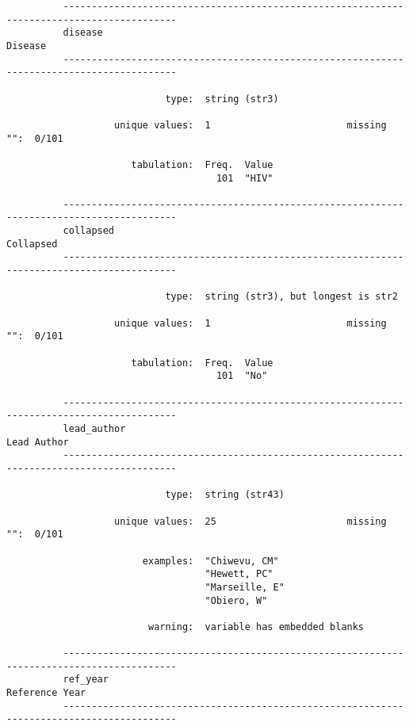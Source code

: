 \documentclass{article}
\begin{document}
\begin{verbatim}
          
          
          
          ------------------------------------------------------------------------------------------
          disease                                                                            Disease
          ------------------------------------------------------------------------------------------
          
                            type:  string (str3)
          
                   unique values:  1                        missing "":  0/101
          
                      tabulation:  Freq.  Value
                                     101  "HIV"
          
          ------------------------------------------------------------------------------------------
          collapsed                                                                        Collapsed
          ------------------------------------------------------------------------------------------
          
                            type:  string (str3), but longest is str2
          
                   unique values:  1                        missing "":  0/101
          
                      tabulation:  Freq.  Value
                                     101  "No"
          
          ------------------------------------------------------------------------------------------
          lead_author                                                                    Lead Author
          ------------------------------------------------------------------------------------------
          
                            type:  string (str43)
          
                   unique values:  25                       missing "":  0/101
          
                        examples:  "Chiwevu, CM"
                                   "Hewett, PC"
                                   "Marseille, E"
                                   "Obiero, W"
          
                         warning:  variable has embedded blanks
          
          ------------------------------------------------------------------------------------------
          ref_year                                                                    Reference Year
          ------------------------------------------------------------------------------------------
          

\end{verbatim}
\end{document}

